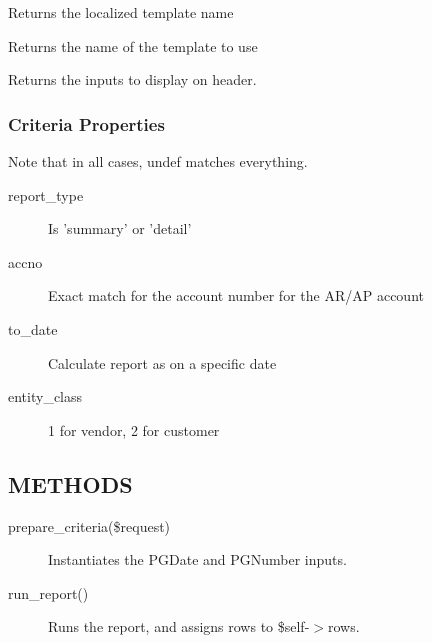 \begin{description}
\begin{description}
\begin{description}
\begin{description}
\begin{description}
\begin{description}
\begin{description}
\begin{description}
\begin{description}
\begin{description}
\begin{description}
Returns the localized template name


\item[{template}] \mbox{}

Returns the name of the template to use


\item[{header\_lines}] \mbox{}

Returns the inputs to display on header.

\end{description}
\subsubsection*{Criteria Properties\label{LedgerSMB::DBObject::Report::Aging_Criteria_Properties}}


Note that in all cases, undef matches everything.

\begin{description}

\item[{report\_type}] \mbox{}

Is 'summary' or 'detail'


\item[{accno}] \mbox{}

Exact match for the account number for the AR/AP account


\item[{to\_date}] \mbox{}

Calculate report as on a specific date


\item[{entity\_class}] \mbox{}

1 for vendor, 2 for customer

\end{description}
\subsection*{METHODS\label{LedgerSMB::DBObject::Report::Aging_METHODS}}
\begin{description}

\item[{prepare\_criteria(\$request)}] \mbox{}

Instantiates the PGDate and PGNumber inputs.


\item[{run\_report()}] \mbox{}

Runs the report, and assigns rows to \$self-$>$rows.


\end{description}
\end{description}
\end{description}
\end{description}
\end{description}
\end{description}
\end{description}
\end{description}
\end{description}
\end{description}
\end{description}
